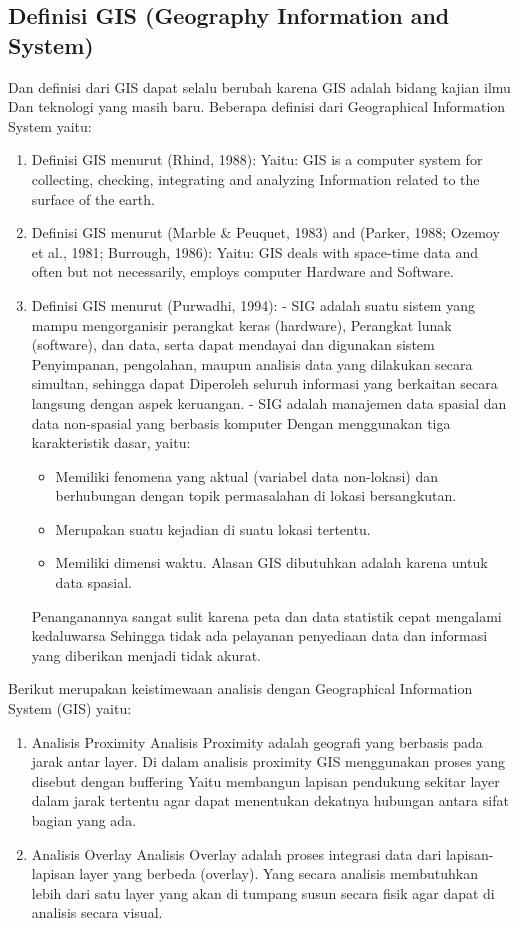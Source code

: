 \subsection{Definisi GIS (Geography Information and System)}
Dan definisi dari GIS dapat selalu berubah karena GIS adalah bidang kajian ilmu 
Dan teknologi yang masih baru. Beberapa definisi dari Geographical Information System yaitu:
\begin{enumerate}
\item Definisi GIS menurut (Rhind, 1988):
Yaitu: GIS is a computer system for collecting, checking, integrating and analyzing
Information related to the surface of the earth.

\item Definisi GIS menurut (Marble \& Peuquet, 1983) and (Parker,
1988; Ozemoy et al., 1981; Burrough, 1986):
Yaitu: GIS deals with space-time data and often but not necessarily, employs computer
Hardware and Software.

\item Definisi GIS menurut (Purwadhi, 1994):
- SIG adalah suatu sistem yang mampu mengorganisir perangkat keras (hardware),
Perangkat lunak (software), dan data, serta dapat mendayai dan digunakan sistem
Penyimpanan, pengolahan, maupun analisis data yang dilakukan secara simultan, sehingga dapat
Diperoleh seluruh informasi yang berkaitan secara langsung dengan aspek keruangan.
- SIG adalah manajemen data spasial dan data non-spasial yang berbasis komputer
Dengan menggunakan tiga karakteristik dasar, yaitu: 
\begin{itemize}
    \item Memiliki fenomena yang aktual (variabel data non-lokasi) dan berhubungan dengan topik permasalahan di lokasi bersangkutan.
    \item Merupakan suatu kejadian di suatu lokasi tertentu.
    \item Memiliki dimensi waktu. Alasan GIS dibutuhkan adalah karena untuk data spasial.
\end{itemize}

Penanganannya sangat sulit karena peta dan data statistik cepat mengalami kedaluwarsa 
Sehingga tidak ada pelayanan penyediaan data dan informasi yang diberikan menjadi tidak akurat.
\end{enumerate} 

Berikut merupakan keistimewaan analisis dengan Geographical Information System (GIS) yaitu:
\begin{enumerate}
\item Analisis Proximity
Analisis Proximity adalah geografi yang berbasis pada jarak antar layer.
Di dalam analisis proximity GIS menggunakan proses yang disebut dengan buffering
Yaitu membangun lapisan pendukung sekitar layer dalam jarak tertentu agar dapat menentukan
dekatnya hubungan antara sifat bagian yang ada.
\item Analisis Overlay
Analisis Overlay adalah proses integrasi data dari lapisan-lapisan layer yang berbeda (overlay).
Yang secara analisis membutuhkan lebih dari satu layer yang akan di tumpang susun secara
fisik agar dapat di analisis secara visual.
\end{enumerate}

